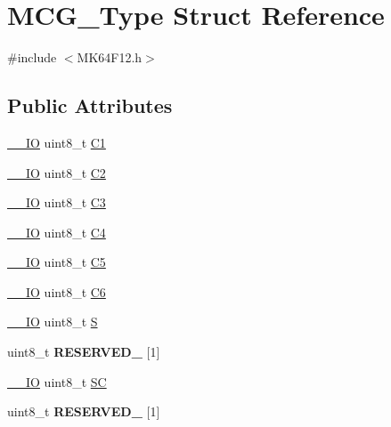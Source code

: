 \hypertarget{structMCG__Type}{}\section{M\+C\+G\+\_\+\+Type Struct Reference}
\label{structMCG__Type}


{\ttfamily \#include $<$M\+K64\+F12.\+h$>$}

\subsection*{Public Attributes}
\begin{DoxyCompactItemize}
\item 
\hyperlink{core__sc300_8h_aec43007d9998a0a0e01faede4133d6be}{\+\_\+\+\_\+\+IO} uint8\+\_\+t \hyperlink{structMCG__Type_a72de946c106d741e2e5f21c35988a7a1}{C1}
\item 
\hyperlink{core__sc300_8h_aec43007d9998a0a0e01faede4133d6be}{\+\_\+\+\_\+\+IO} uint8\+\_\+t \hyperlink{structMCG__Type_a2a7672cdea44c417e9eaddd438fb3609}{C2}
\item 
\hyperlink{core__sc300_8h_aec43007d9998a0a0e01faede4133d6be}{\+\_\+\+\_\+\+IO} uint8\+\_\+t \hyperlink{structMCG__Type_a0c45cd85b1baf3e6a0a3a802e26cbe38}{C3}
\item 
\hyperlink{core__sc300_8h_aec43007d9998a0a0e01faede4133d6be}{\+\_\+\+\_\+\+IO} uint8\+\_\+t \hyperlink{structMCG__Type_ae8c2ac6766d7888e745befae1e0b39db}{C4}
\item 
\hyperlink{core__sc300_8h_aec43007d9998a0a0e01faede4133d6be}{\+\_\+\+\_\+\+IO} uint8\+\_\+t \hyperlink{structMCG__Type_ab94b0f073b5f69bc2cdfa61f7fd0a992}{C5}
\item 
\hyperlink{core__sc300_8h_aec43007d9998a0a0e01faede4133d6be}{\+\_\+\+\_\+\+IO} uint8\+\_\+t \hyperlink{structMCG__Type_a3739313253d53250920a429e3d9f8c9b}{C6}
\item 
\hyperlink{core__sc300_8h_aec43007d9998a0a0e01faede4133d6be}{\+\_\+\+\_\+\+IO} uint8\+\_\+t \hyperlink{structMCG__Type_aa181a88ea541ca57f4c8402862d0860c}{S}
\item 
uint8\+\_\+t {\bfseries R\+E\+S\+E\+R\+V\+E\+D\+\_} \mbox{[}1\mbox{]}\hypertarget{structMCG__Type_a253a99ac93c85addc455152d42ee7f0c}{}\label{structMCG__Type_a253a99ac93c85addc455152d42ee7f0c}

\item 
\hyperlink{core__sc300_8h_aec43007d9998a0a0e01faede4133d6be}{\+\_\+\+\_\+\+IO} uint8\+\_\+t \hyperlink{structMCG__Type_a7fd146380faf9dd7da4763f061b26564}{SC}
\item 
uint8\+\_\+t {\bfseries R\+E\+S\+E\+R\+V\+E\+D\+\_} \mbox{[}1\mbox{]}\hypertarget{structMCG__Type_ad914cd67c65f5783a0b875ae8d96d3c9}{}\label{structMCG__Type_ad914cd67c65f5783a0b875ae8d96d3c9}


\end{DoxyCompactItemize}
